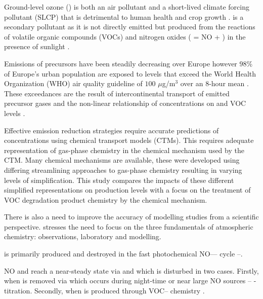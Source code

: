 Ground-level ozone () is both an air pollutant and a short-lived climate forcing pollutant (SLCP) that is detrimental to human health and crop growth \citep{AQEU:2013}. 
 is a secondary pollutant as it is not directly emitted but produced from the reactions of volatile organic compounds (VOCs) and nitrogen oxides ( = NO + ) in the presence of sunlight \citep{Atkinson:2000}.

Emissions of  precursors have been steadily decreasing over Europe however $98$\% of Europe's urban population are exposed to levels that exceed the World Health Organization (WHO) air quality guideline of $100$ $\mu$g/m$^3$ over an $8$-hour mean \citep{WHO:2006}. 
These exceedances are the result of intercontinental transport of emitted  precursor gases and the non-linear relationship of  concentrations on  and VOC levels \citep{AQEU:2013}.

Effective emission reduction strategies require accurate predictions of  concentrations using chemical transport models (CTMs). 
This requires adequate representation of gas-phase chemistry in the chemical mechanism used by the CTM. 
Many chemical mechanisms are available, these were developed using differing streamlining approaches to gas-phase chemistry resulting in varying levels of simplification. 
This study compares the impacts of these different simplified representations on  production levels with a focus on the treatment of VOC degradation product chemistry by the chemical mechanism.

There is also a need to improve the accuracy of modelling studies from a scientific perspective. 
\citet{Abbatt:2014} stresses the need to focus on the three fundamentals of atmospheric chemistry: observations, laboratory and modelling. 

 is primarily produced and destroyed in the fast photochemical NO---- cycle --. 
\begin{reactionlist}
\end{reactionlist}
NO and  reach a near-steady state via  and  which is disturbed in two cases. 
Firstly, when  is removed via  which occurs during night-time or near large NO sources -- -titration. 
Secondly, when  is produced through VOC-- chemistry \citep{Sillman:1999}.

